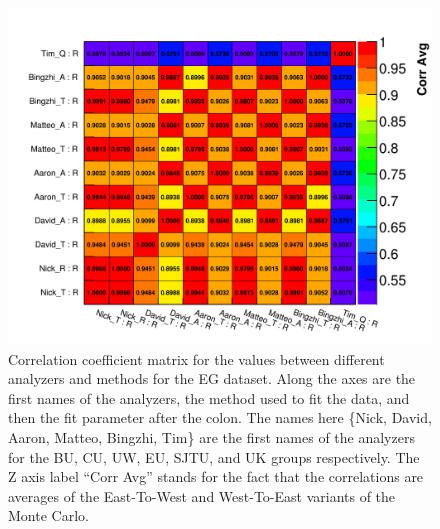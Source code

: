 \begin{figure}
\centering
\includegraphics[width=\textwidth]{Avg_CorrelationMatrix_R_R}
\caption{Correlation coefficient matrix for the \R values between different analyzers and methods for the EG dataset. Along the axes are the first names of the analyzers, the method used to fit the data, and then the fit parameter after the colon. The names here \{Nick, David, Aaron, Matteo, Bingzhi, Tim\} are the first names of the analyzers for the BU, CU, UW, EU, SJTU, and UK groups respectively. The Z axis label ``Corr Avg'' stands for the fact that the correlations are averages of the East-To-West and West-To-East variants of the Monte Carlo.}
\label{fig:corrMatAnalyzer}
\end{figure}

